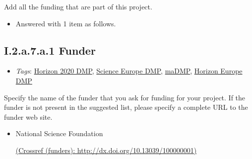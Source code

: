 \documentclass[a4paper,12pt]{report}
\begin{document}
\noindent
\begin{markdown}
Add all the funding that are part of this project.
\end{markdown}


\begin{itemize}
  \item[\ArrowBoldDownRight] Answered with 1 item as follows.
\end{itemize}%
\subsection*{\protect\textcolor{colorSecId}{I.2.a.7.a.1} Funder}

\label{1e85da40-bbfc-4180-903e-6c569ed2da38.c3dabaaf-c946-4a0d-889c-ede966f97667.a14632ce-345c-48fa-8757-db609735ca1e.36a87eac-402d-43fb-a0df-ac5963bdf87d.c0562191-ba60-46e7-afc0-1cd6821f8568.0b12fb8c-ee0f-40c0-9c53-b6826b786a0c}


\begin{itemize}
  \item \textit{Tags}: \ul{Horizon 2020 DMP}, \ul{Science Europe DMP}, \ul{maDMP}, \ul{Horizon Europe DMP}
  \end{itemize}


\noindent
\begin{markdown}
Specify the name of the funder that you ask for funding for your project. If the funder is not present in the suggested list, please specify a complete URL to the funder web site.

\end{markdown}



\begin{itemize}
  \item[\CheckmarkBold]
  \begin{markdown}
  National Science Foundation
  \end{markdown}
  \href{http://dx.doi.org/10.13039/100000001}{(Crossref (funders): http://dx.doi.org/10.13039/100000001)}
  
\end{itemize}
\end{document}
